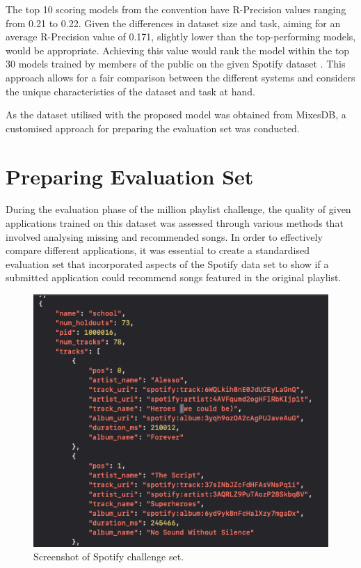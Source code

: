 The top 10 scoring models from the convention have R-Precision values ranging from 0.21 to 0.22. Given the differences in dataset size and task, aiming for an average R-Precision value of 0.171, slightly lower than the top-performing models, would be appropriate. Achieving this value would rank the model within the top 30 models trained by members of the public on the given Spotify dataset \citep{aicrowd_aicrowd_2023}. This approach allows for a fair comparison between the different systems and considers the unique characteristics of the dataset and task at hand. 

As the dataset utilised with the proposed model was obtained from MixesDB, a customised approach for preparing the evaluation set was conducted.

\section{Preparing Evaluation Set}
During the evaluation phase of the million playlist challenge, the quality of given applications trained on this dataset was assessed through various methods that involved analysing missing and recommended songs. In order to effectively compare different applications, it was essential to create a standardised evaluation set that incorporated aspects of the Spotify data set to show if a submitted application could recommend songs featured in the original playlist.

\begin{figure}[H]
	\includegraphics[scale=0.5]{images/spotify_challenge_set}
	\centering
	\caption{Screenshot of Spotify challenge set. \citep{aicrowd_aicrowd_2023}} 
\end{figure}

